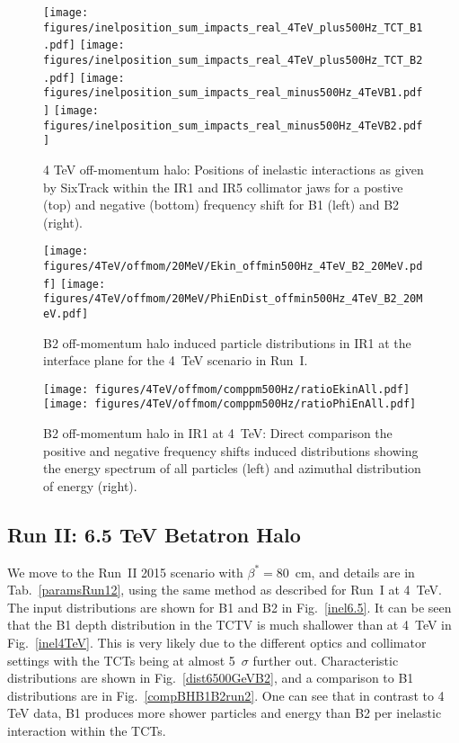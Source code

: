 \begin{figure}
\begin{center}
\texttt{[image: figures/inelposition\_sum\_impacts\_real\_4TeV\_plus500Hz\_TCT\_B1.pdf]}
\texttt{[image: figures/inelposition\_sum\_impacts\_real\_4TeV\_plus500Hz\_TCT\_B2.pdf]}
\texttt{[image: figures/inelposition\_sum\_impacts\_real\_minus500Hz\_4TeVB1.pdf]}
\texttt{[image: figures/inelposition\_sum\_impacts\_real\_minus500Hz\_4TeVB2.pdf]}
\end{center}
\vspace{-0.6cm}
 \caption{4 TeV off-momentum halo: Positions of inelastic interactions as given by SixTrack within the IR1 and IR5 collimator jaws for a postive (top) and negative (bottom) frequency shift for B1 (left) and B2 (right).
  \label{inel4TeVOffmom}}
\end{figure}


\begin{figure}
\begin{center}
  \texttt{[image: figures/4TeV/offmom/20MeV/Ekin\_offmin500Hz\_4TeV\_B2\_20MeV.pdf]}
  \texttt{[image: figures/4TeV/offmom/20MeV/PhiEnDist\_offmin500Hz\_4TeV\_B2\_20MeV.pdf]}
\end{center}
\vspace{-0.6cm}
 \caption{B2 off-momentum halo induced particle distributions in IR1 at the interface plane for the 4~TeV scenario in Run~I.
  \label{offmom4TeV}}
\end{figure}

\begin{figure}
  \centering
  \texttt{[image: figures/4TeV/offmom/comppm500Hz/ratioEkinAll.pdf]}
  \texttt{[image: figures/4TeV/offmom/comppm500Hz/ratioPhiEnAll.pdf]}
  \caption{B2 off-momentum halo in IR1 at 4~TeV: Direct comparison the positive and negative frequency shifts induced distributions showing the energy spectrum of all particles (left) and azimuthal distribution of energy (right).
    \label{compPM}}
\end{figure}

\subsection{Run II: 6.5 TeV Betatron Halo}

We move to the Run~II 2015 scenario with $\beta^* = 80$~cm, and details are in Tab.~\ref{paramsRun12}, using the same method as described for Run~I at 4~TeV. The input distributions are shown for B1 and B2 in Fig.~\ref{inel6.5}. It can be seen that the B1 depth distribution in the TCTV is much shallower than at 4~TeV in Fig.~\ref{inel4TeV}. This is very likely due to the different optics and collimator settings with the TCTs being at almost 5~$\sigma$ further out. Characteristic distributions are shown in Fig.~\ref{dist6500GeVB2}, and a comparison to B1 distributions are in Fig.~\ref{compBHB1B2run2}. One can see that in contrast to 4 TeV data, B1 produces more shower particles and energy than B2 per inelastic interaction within the TCTs. 



